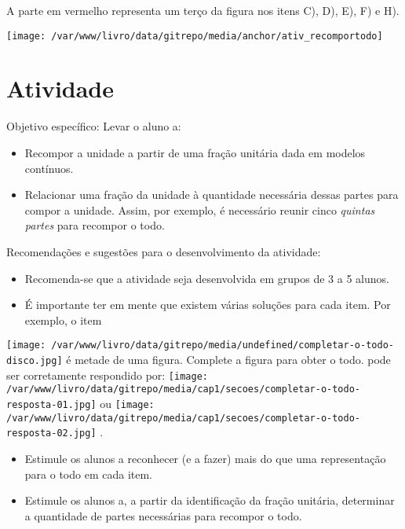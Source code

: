 \documentclass[a4paper,12pt,twoside]{book}
\begin{document}
\begin{resposta*}[breakable]{}{}  
  A parte em vermelho representa um terço da figura nos itens C), D), E), F) e H).   
\end{resposta*}




\texttt{[image: /var/www/livro/data/gitrepo/media/anchor/ativ\_recomportodo]}
\section{Atividade}




\begin{professor*}[breakable]{}{}  
  Objetivo específico: Levar o aluno a:  
\begin{itemize} %
    \item       Recompor a unidade a partir de uma fração unitária dada em modelos contínuos. 
    \item       Relacionar uma fração da unidade à quantidade necessária dessas partes para compor a unidade. Assim, por exemplo, é necessário reunir cinco       {\it quintas partes}       para recompor o todo.
\end{itemize} %
  
        
  
  Recomendações e sugestões para o desenvolvimento da atividade:  
\begin{itemize} %
    \item       Recomenda-se que a atividade seja desenvolvida em grupos de 3 a 5 alunos.
    \item       É importante ter em mente que existem várias soluções para cada item. Por exemplo, o item 
\end{itemize} %
    \texttt{[image: /var/www/livro/data/gitrepo/media/undefined/completar-o-todo-disco.jpg]}   é metade de uma figura. Complete a figura para obter o todo. pode ser corretamente respondido por:     \texttt{[image: /var/www/livro/data/gitrepo/media/cap1/secoes/completar-o-todo-resposta-01.jpg]}   ou     \texttt{[image: /var/www/livro/data/gitrepo/media/cap1/secoes/completar-o-todo-resposta-02.jpg]}  .  
\begin{itemize} %
    \item       Estimule os alunos a reconhecer (e a fazer) mais do que uma representação para o todo em cada item.
    \item       Estimule os alunos a, a partir da identificação da fração unitária, determinar a quantidade de partes necessárias para recompor o todo.
\end{itemize} %
  
\end{professor*}
\end{document}
